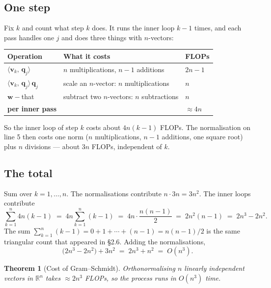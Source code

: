 \documentclass[11pt]{article}
\theoremstyle{plain}
\newtheorem{thm}{Theorem}[section]
\theoremstyle{definition}
\theoremstyle{remark}
\newcommand{\R}{\mathbb{R}}
\newcommand{\vc}[1]{\mathbf{#1}}
\newcommand{\ip}[2]{\langle #1,\, #2\rangle}
\begin{document}
\subsection{One step}
Fix $k$ and count what step $k$ does. It runs the inner loop $k-1$ times, and
each pass handles one $j$ and does three things with $n$-vectors:
\begin{center}
\renewcommand{\arraystretch}{1.35}
\begin{tabular}{@{}l l l@{}}
\toprule
\textbf{Operation} & \textbf{What it costs} & \textbf{FLOPs} \\
\midrule
$\ip{\vc{v}_{k}}{\vc{q}_{j}}$
  & $n$ multiplications, $n-1$ additions & $2n-1$ \\
$\ip{\vc{v}_{k}}{\vc{q}_{j}}\,\vc{q}_{j}$
  & scale an $n$-vector: $n$ multiplications & $n$ \\
$\vc{w}-{}$that
  & subtract two $n$-vectors: $n$ subtractions & $n$ \\
\midrule
\textbf{per inner pass} & & $\approx 4n$ \\
\bottomrule
\end{tabular}
\end{center}

\noindent So the inner loop of step $k$ costs about $4n(k-1)$ FLOPs. The
normalisation on line 5 then costs one norm ($n$ multiplications, $n-1$
additions, one square root) plus $n$ divisions --- about $3n$ FLOPs, independent
of $k$.

\subsection{The total}
Sum over $k=1,\dots,n$. The normalisations contribute $n\cdot 3n=3n^{2}$. The
inner loops contribute
\[
  \sum_{k=1}^{n} 4n(k-1)
  \;=\; 4n\sum_{k=1}^{n}(k-1)
  \;=\; 4n\cdot\frac{n(n-1)}{2}
  \;=\; 2n^{2}(n-1)
  \;=\; 2n^{3}-2n^{2} .
\]
The sum $\sum_{k=1}^{n}(k-1)=0+1+\cdots+(n-1)=n(n-1)/2$ is the same triangular
count that appeared in \S2.6. Adding the normalisations,
\[
  \bigl(2n^{3}-2n^{2}\bigr) + 3n^{2} \;=\; 2n^{3}+n^{2}
  \;=\; O(n^{3}) .
\]

\begin{thm}[Cost of Gram--Schmidt]
Orthonormalising $n$ linearly independent vectors in $\R^{n}$ takes
$\approx 2n^{3}$ FLOPs, so the process runs in $O(n^{3})$ time.
\end{thm}
\end{document}
